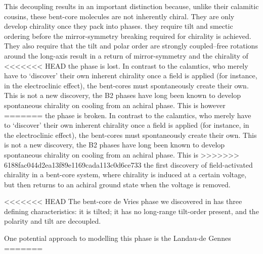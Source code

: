 \documentclass[aagreenthesis]{subfiles}
\begin{document}
This decoupling results in 
an important distinction because, unlike their calamitic cousins, these
bent-core molecules are not inherently chiral. They are only develop chirality
once they pack into phases. they require tilt and smectic ordering
before the mirror-symmetry breaking required for chirality is achieved. They
also require that the tilt and polar order are strongly coupled--free rotations
around the long-axis result in a return of mirror-symmetry and the chirality of
<<<<<<< HEAD
the phase is lost. In contrast to the calamtics, who merely have to `discover'
their own inherent chirality once a field is applied (for instance, in the
electroclinic effect), the bent-cores must spontaneously create their own. This
is not a new discovery, the B2 phases\cite{link_spontaneous_1997} have long been
known to develop spontaneous chirality on cooling from an achiral phase. This
is however
=======
the phase is broken. In contrast to the calamtics, who merely have to `discover'
their own inherent chirality once a field is applied (for instance, in the
electroclinic effect), the bent-cores must spontaneously create their own. This
is not a new discovery, the B2 phases\cite{link_spontaneous_1997} have long been
known to develop spontaneous chirality on cooling from an achiral phase. This is
>>>>>>> 6188fac044d2ea13f89e1169cada113c0d6ce733
the first discovery of field-activated chirality in a bent-core system, where
chirality is induced at a certain voltage, but then returns to an achiral ground
state when the voltage is removed.

<<<<<<< HEAD
The bent-core de Vries phase we discovered in \nfour{} has three defining
characteristics: it is tilted; it has no long-range tilt-order present, and the
polarity and tilt are decoupled.

One potential approach to modelling this phase is the Landau-de Gennes
=======
\end{document}
